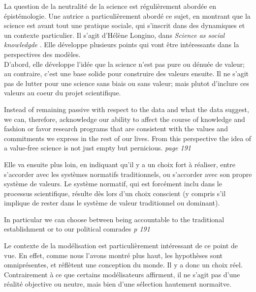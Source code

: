 La question de la neutralité de la science est régulièrement abordée en épistémologie. Une autrice a particulièrement abordé ce sujet, en montrant que la science est avant tout une pratique sociale, qui s'inscrit dans des dynamiques et un contexte particulier. Il s'agit d'Hélène Longino, dans \emph{Science as social knowledgde} \autocite{longino_science_1990}. Elle développe plusieurs points qui vont être intéressants dans la perspectives des modèles. \\

D'abord, elle développe l'idée que la science n'est pas pure ou dénuée de valeur; au contraire, c'est une base solide pour construire des valeurs ensuite. Il ne s'agit pas de lutter pour une science sans biais ou sans valeur; mais plutot d'inclure ces valeurs au coeur du projet scientifique. 

\begin{authoredquote}
    Instead of remaining passive with respect to the data and what the data suggest, we can, therefore, acknowledge our ability to affect the course of knowledge and fashion or favor research programs that are consistent with the values and commitments we express in the rest of our lives. From this perspective the idea of a value-free science is not just empty but pernicious. \textit{page 191}
\end{authoredquote}

Elle va ensuite plus loin, en indiquant qu'il y a un choix fort à réaliser, entre s'accorder avec les systèmes normatifs traditionnels, ou s'accorder avec son propre système de valeurs. Le système normatif, qui est forcément inclu dans le processus scientifique, résulte dès lors d'un choix conscient (y compris s'il implique de rester dans le système de valeur traditionnel ou dominant). 

\begin{authoredquote}
    In particular we can choose between being accountable to the traditional establishment or to our political comrades \textit{p 191}
\end{authoredquote}

Le contexte de la modélisation est particulièrement intéressant de ce point de vue. En effet, comme nous l'avons montré plus haut, les hypothèses sont omniprésentes, et réflètent une conception du monde. Il y a donc un choix réel. Contrairement à ce que certains modélisateurs affirment, il ne s'agit pas d'une réalité objective ou neutre, mais bien d'une sélection hautement normaitve. \\





